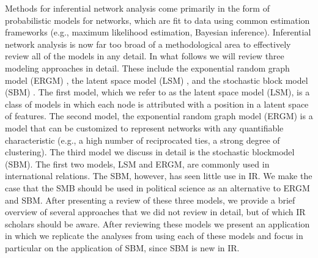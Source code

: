 \documentclass[fleqn,12pt]{wlscirep}
\begin{document}
 
Methods for inferential network analysis come primarily in the form of probabilistic models for networks, which are fit to data using common estimation frameworks (e.g., maximum likelihood estimation, Bayesian inference). Inferential network analysis is now far too broad of a methodological area to effectively review all of the models in any detail. In what follows we will review three modeling approaches in detail. These include the exponential random graph model (ERGM) \citep{cranmer2011inferential}, the latent space model (LSM) \citep{dorff2016latent},  and the stochastic block model (SBM) \citep{latouche2011overlapping}. The first model, which we refer to as the latent space model (LSM), is a class of models in which each node is attributed with a position in a latent space of features. The second model, the exponential random graph model (ERGM) is a model that can be customized to represent networks with any quantifiable characteristic (e.g., a high number of reciprocated ties, a strong degree of clustering).  The third model we discuss in detail is the stochastic blockmodel (SBM). The first two models, LSM and ERGM, are commonly used in international relations. The SBM, however, has seen little use in IR. We make the case that the SMB should be used in political science as an alternative to ERGM and SBM. After presenting a review of these three models, we provide a brief overview of several approaches that we did not review in detail, but of which IR scholars should be aware. After reviewing these models we present an application in which we replicate the analyses from  using each of these models and focus in particular on the application of SBM, since SBM is new in IR.
\end{document}
